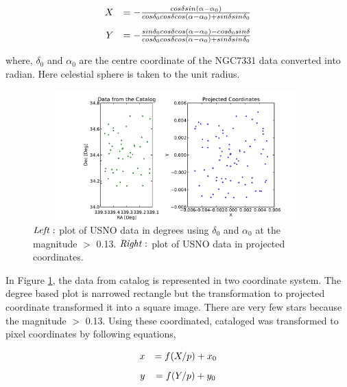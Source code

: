 \documentclass[a4paper,12pt]{article}
\begin{document}
\begin{equation}
\label{eq:projected}
\begin{array}{rcl}
   \vspace{0.3cm}
   X &= -\frac{cos\delta sin(\alpha-\alpha_0)}{cos\delta_0 cos\delta cos(\alpha-\alpha_0)+sin\delta sin\delta_0}\\
   Y &= -\frac{sin\delta_0 cos\delta cos(\alpha-\alpha_0)-cos\delta_0 sin\delta}{cos\delta_0 cos\delta cos(\alpha-\alpha_0)+sin\delta sin\delta_0} 
\end{array}
\end{equation}

where, $\delta_0$ and $\alpha_0$ are the centre coordinate of the NGC7331 data converted into radian.  Here celestial sphere is taken to the unit radius. 

\begin{figure}[H]
	\centering
	\includegraphics[angle=0,height=5cm,width=11cm]{galaxy/catalog.pdf}
	\caption{$\it{Left:}$ plot of USNO data in degrees using $\delta_0$ and $\alpha_0$ at the magnitude $>$ 0.13. $\it{Right:}$ plot of USNO data in projected coordinates.}
	\label{fig:catalog}
\end{figure}

In Figure \ref{fig:catalog}, the data from catalog is represented in two coordinate system. The degree based plot is narrowed rectangle but the transformation to projected coordinate transformed it into a square image. There are very few stars because the magnitude $>$ 0.13. Using these coordinated, cataloged was transformed to pixel coordinates by following equations,

\begin{equation}
\label{eq:pixel}
\begin{array}{rcl}
   \vspace{0.3cm}
   x &= f(X/p)+x_0\\
   y &= f(Y/p)+y_0
\end{array}
\end{equation}
\end{document}
